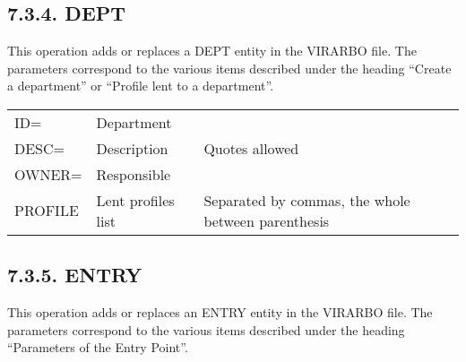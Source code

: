 \documentclass[letterpaper,10pt,english]{sphinxmanual}
\begin{document}
\subsection{7.3.4. DEPT}
\label{\detokenize{Installation_Guide:dept}}
This operation adds or replaces a DEPT entity in the VIRARBO file. The parameters correspond to the various items
described under the heading “Create a department” or “Profile lent to a department”.


\begin{savenotes}\sphinxattablestart
\centering
\begin{tabulary}{\linewidth}[t]{|T|T|T|}
\hline
{}\relax &\relax &\relax \\
\hline
ID=
&
Department
&\\
\hline
DESC=
&
Description
&
Quotes allowed
\\
\hline
OWNER=
&
Responsible
&\\
\hline
PROFILE
&
Lent profiles list
&
Separated by commas, the whole between parenthesis
\\
\hline
\end{tabulary}
\par
\sphinxattableend\end{savenotes}


\subsection{7.3.5. ENTRY}
\label{\detokenize{Installation_Guide:entry}}
This operation adds or replaces an ENTRY entity in the VIRARBO file. The parameters correspond to the various items
described under the heading “Parameters of the Entry Point”.
\end{document}
